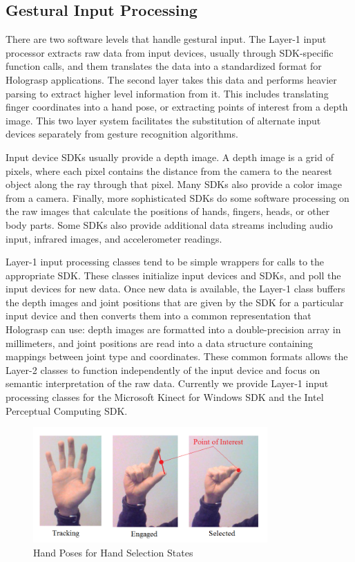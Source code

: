 \documentclass[pageno]{jpaper}
\begin{document}
\subsection{Gestural Input Processing}
There are two software levels that handle gestural input. The Layer-1 input processor extracts raw data from input devices, usually through
SDK-specific function calls, and them translates the data into a standardized format for Holograsp applications. The second layer takes this data and performs heavier
parsing to extract higher level information from it. This includes translating finger coordinates into a hand pose, or extracting
points of interest from a depth image. This two layer system facilitates the substitution of alternate input devices separately from
gesture recognition algorithms.

Input device SDKs usually provide a depth image. A depth image is a grid of pixels, where each
pixel contains the distance from the camera to the nearest object along the ray through that pixel. Many SDKs
also provide a color image from a camera. Finally, more sophisticated SDKs do some software processing on the
raw images that calculate the positions of hands, fingers, heads, or other body parts. Some SDKs also provide
additional data streams including audio input, infrared images, and accelerometer readings.

Layer-1 input processing classes tend to be simple wrappers for calls to the appropriate SDK. These classes initialize input devices
and SDKs, and poll the input devices for new data. Once new data is available, the Layer-1 class buffers
the depth images and joint positions that are given by the SDK for a particular input device and then
converts them into a common representation that Holograsp can use: depth images are formatted into a double-precision
array in millimeters, and joint positions are read into a data structure containing mappings between joint type and coordinates.
These common formats allows the Layer-2 classes to function independently of the input device and focus on semantic
interpretation of the raw data. Currently we provide Layer-1 input processing classes for the Microsoft Kinect for Windows SDK and the
Intel Perceptual Computing SDK. 

\begin{figure}[H]
\centering
\includegraphics[width=0.8\textwidth]{figures/poses.png}
\caption{Hand Poses for Hand Selection States}
\label{fig:poses}
\end{figure}
\end{document}
